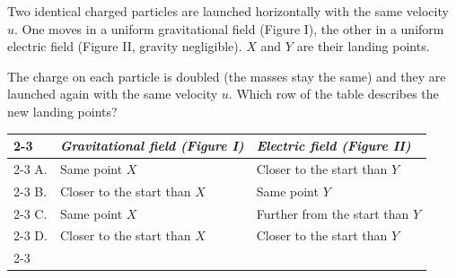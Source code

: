 \begin{quizq}{}
Two identical charged particles are launched horizontally with the same velocity $u$. One moves in a
uniform gravitational field (Figure I), the other in a uniform electric field (Figure II, gravity
negligible). $X$ and $Y$ are their landing points.
\begin{center}
  \hspace{20mm}%
\end{center}
The charge on each particle is doubled (the masses stay the same) and they are launched again with
the same velocity $u$. Which row of the table describes the new landing points?
\begin{center}
  \renewcommand\arraystretch{1.7}
  \begin{tabular}{@{}p{10mm}|>{\centering\arraybackslash}p{48mm}|>{\centering\arraybackslash}p{48mm}|}
    \cline{2-3}
    & \textit{Gravitational field (Figure I)} & \textit{Electric field (Figure II)}\\ \cline{2-3}
    A. & Same point $X$ & Closer to the start than $Y$\\ \cline{2-3}
    B. & Closer to the start than $X$ & Same point $Y$\\ \cline{2-3}
    C. & Same point $X$ & Further from the start than $Y$\\ \cline{2-3}
    D. & Closer to the start than $X$ & Closer to the start than $Y$\\ \cline{2-3}
  \end{tabular}
\end{center}
\end{quizq}

